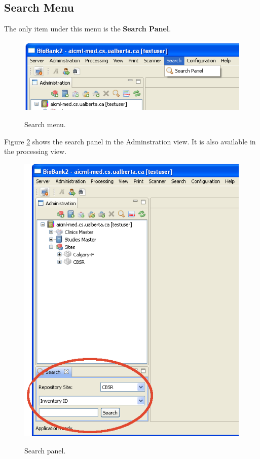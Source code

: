 \subsection{Search Menu}
The only item under this menu is the \textbf{Search Panel}.
    \begin{figure}[H]
      \centering
      \scalebox{0.5}
      { \includegraphics*{screenshots/overview/main_menu_search} }
      \caption{Search menu.}
      \label{fig:main_menu_search}
    \end{figure}
Figure \ref{fig:search_panel} shows the search panel in the Adminstration
view. It is also available in the processing view.
    \begin{figure}[H]
      \centering
      \scalebox{0.5}
      { \includegraphics*{screenshots/overview/search_panel} }
      \caption{Search panel.}
      \label{fig:search_panel}
    \end{figure}
